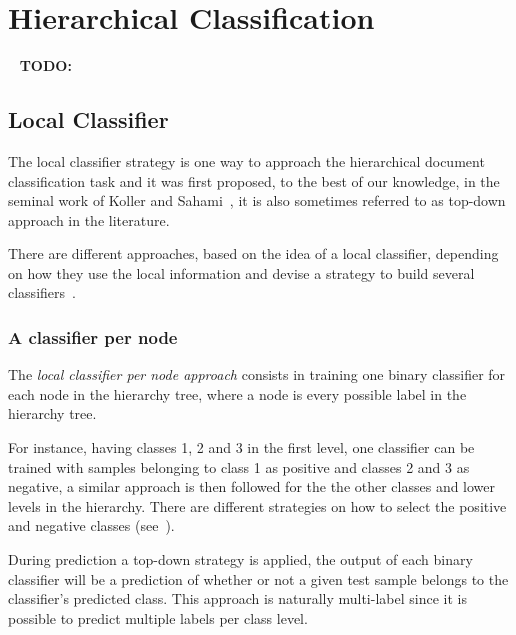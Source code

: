 \documentclass[11pt,a4paper]{article}
\begin{document}


\section{Hierarchical Classification}\label{hierarchical-clf}


\ \newline
\textbf{TODO:}
\ \newline


\subsection{Local Classifier}

The local classifier strategy is one way to approach the hierarchical document classification task
and it was first proposed, to the best of our knowledge, in the seminal work of Koller and
Sahami~, it is also sometimes referred to as top-down
approach in the literature.

There are different approaches, based on the idea of a local classifier, depending on how they use
the local information and devise a strategy to build several classifiers~\cite{Silla:2011:SHC:1937796.1937884}.


\subsubsection{A classifier per node} %
The \textit{local classifier per node approach} consists in training one binary classifier for each
node in the hierarchy tree, where a node is every possible label in the hierarchy tree.

For instance, having classes 1, 2 and 3 in the first level, one classifier can be trained with
samples belonging to class 1 as positive and classes 2 and 3 as negative, a similar approach is then
followed for the the other classes and lower levels in the hierarchy. There are different strategies
on how to select the positive and negative classes (see~\cite{}).

During prediction a top-down strategy is applied, the output of each binary classifier will be a
prediction of whether or not a given test sample belongs to the classifier’s predicted class. This
approach is naturally multi-label since it is possible to predict multiple labels per class level.
\end{document}
